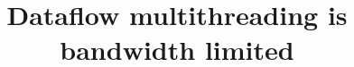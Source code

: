 
\usepackage{microtype}




\title{\Large Dataflow multithreading is bandwidth limited}



\maketitle
\begin{abstract}

\end{abstract}















%






